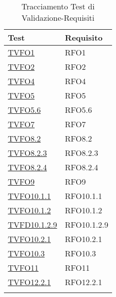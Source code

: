 \normalsize
\begin{longtable}{|>{\centering}m{5cm}|m{5cm}<{\centering}|}
	\hline \rowcolor{Gray}
	\textbf{Test} & \textbf{Requisito}\\
	\hline
	\endhead
	\hyperlink{TVFO1}{TVFO1} & RFO1\\ \hline
	\hyperlink{TVFO2}{TVFO2} & RFO2\\ \hline
	\hyperlink{TVFO4}{TVFO4} & RFO4\\ \hline
	\hyperlink{TVFO5}{TVFO5} & RFO5\\ \hline
	\hyperlink{TVFO5.6}{TVFO5.6} & RFO5.6\\ \hline
	\hyperlink{TVFO7}{TVFO7} & RFO7\\ \hline
	\hyperlink{TVFO8.2}{TVFO8.2} & RFO8.2\\ \hline
	\hyperlink{TVFO8.2.3}{TVFO8.2.3} & RFO8.2.3\\ \hline
	\hyperlink{TVFO8.2.4}{TVFO8.2.4} & RFO8.2.4\\ \hline
	\hyperlink{TVFO9}{TVFO9} & RFO9\\ \hline
	\hyperlink{TVFO10.1.1}{TVFO10.1.1} & RFO10.1.1\\ \hline
	\hyperlink{TVFO10.1.2}{TVFO10.1.2} & RFO10.1.2\\ \hline
	\hyperlink{TVFD10.1.2.9}{TVFD10.1.2.9} & RFO10.1.2.9\\ \hline
	\hyperlink{TVFO10.2.1}{TVFO10.2.1} & RFO10.2.1\\ \hline
	\hyperlink{TVFO10.3}{TVFO10.3} & RFO10.3\\ \hline
	\hyperlink{TVFO11}{TVFO11} & RFO11\\ \hline
	\hyperlink{TVFO12.2.1}{TVFO12.2.1} & RFO12.2.1\\ \hline
	\caption[Tracciamento Test di Validazione-Requisiti]{Tracciamento Test di Validazione-Requisiti}
	\label{tabella:tv-requi}
\end{longtable}
\clearpage